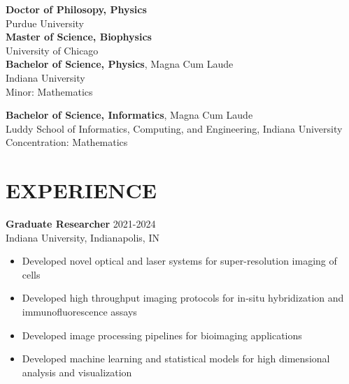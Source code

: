 \documentclass[margin, 10pt]{res} %
\begin{document}
\begin{resume}
\textbf{Doctor of Philosopy, Physics}\\
Purdue University\\

\textbf{Master of Science, Biophysics}\\
University of Chicago\\


\textbf{Bachelor of Science, Physics}, Magna Cum Laude\\
Indiana University\\
Minor: Mathematics 

\textbf{Bachelor of Science, Informatics}, Magna Cum Laude\\
Luddy School of Informatics, Computing, and Engineering, Indiana University\\
Concentration: Mathematics 
  
 
\section{EXPERIENCE}

\textbf{Graduate Researcher} \hfill 2021-2024 \\
Indiana University, Indianapolis, IN

\begin{itemize} \itemsep -2pt %

\item Developed novel optical and laser systems for super-resolution imaging of cells 

\item Developed high throughput imaging protocols for in-situ hybridization and immunofluorescence assays

\item Developed image processing pipelines for bioimaging applications

\item Developed machine learning and statistical models for high dimensional analysis and visualization





\end{itemize}
\end{resume}
\end{document}
